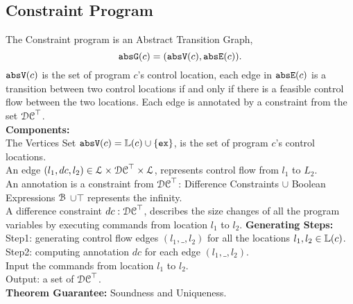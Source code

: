 \subsection{Constraint Program}
\label{sec:abs_prog}
The Constraint program is an Abstract Transition Graph,
\[{\mathtt{abs}}{{\mathtt{G}}}(c) =({\mathtt{abs}}{{\mathtt{V}}}(c), {\mathtt{abs}}{{\mathtt{E}}}(c)).\]
%
${\mathtt{abs}}{{\mathtt{V}}}(c)$ is the set of program $c$'s control location, each edge in ${\mathtt{abs}}{{\mathtt{E}}}(c)$ is a transition
between two control locations if and only if there is a feasible control flow between the two locations.
Each edge is annotated by a constraint
from the set $\mathcal{DC}^{\top}$.
\\
\textbf{Components:} 
\\
The Vertices Set ${\mathtt{abs}}{{\mathtt{V}}}(c) = \mathbb{L}(c)\cup\{{{\mathtt{ex}}}\}$, is the set of program $c$'s control locations.
\\
An edge $(l_1, dc, l_2) \in \mathcal{L} \times \mathcal{DC}^{\top} \times \mathcal{L}$, represents control flow from $l_1$ to $L_2$.
\\
An annotation is a constraint from $\mathcal{DC}^{\top}$: Difference Constraints $\cup$ Boolean Expressions $\mathcal{B}$ $\cup \top$ represents the infinity.
\\
A difference constraint $dc: \mathcal{DC}^{\top}$,
describes the size changes of all the program variables by executing commands from location $l_1$ to $l_2$.
\textbf{Generating Steps:} 
\\
Step1: generating control flow edges $(l_1, \_, l_2)$ for all the locations $l_1, l_2 \in \mathbb{L}(c)$.
\\
Step2: computing annotation $dc$ for each edge $(l_1, \_, l_2)$.
\\
Input the commands from location $l_1$ to $l_2$.
\\
Output: a set of $\mathcal{DC}^{\top}$.
\\
\textbf{Theorem Guarantee:}
Soundness and Uniqueness.

